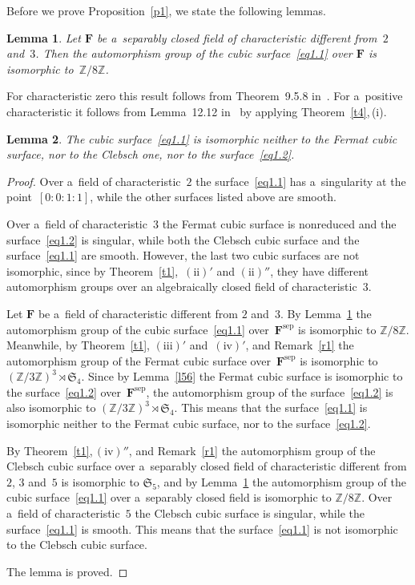 \documentclass{amsart}
\numberwithin{equation}{section}
\theoremstyle{plain}
\newtheorem{lemma}{Lemma}
\theoremstyle{definition}
\theoremstyle{remark}
\begin{document}
Before we prove Proposition~\ref{p1}, we state the following lemmas.

\begin{lemma}
\label{l57}
Let $\mathbf{F}$ be a~separably closed field of characteristic different from~$2$ and~$3$. Then the automorphism group of the cubic surface~\eqref{eq1.1} over $\mathbf{F}$ is isomorphic to~$\mathbb{Z}/8\mathbb{Z}$.
\end{lemma}

For characteristic zero this result follows from Theorem~9.5.8 in~\cite{7}. For a~positive characteristic it follows from Lemma~12.12 in~\cite{8} by applying Theorem~\ref{t4},\,(i).

\begin{lemma}
\label{l58} The
cubic surface~\eqref{eq1.1} is isomorphic neither to the Fermat cubic surface, nor to the Clebsch one, nor to the surface~\eqref{eq1.2}.
\end{lemma}

\begin{proof}
Over a~field of characteristic~$2$ the surface~\eqref{eq1.1} has a~singularity at the point~\mbox{$[0:0:1:1]$,} while the other surfaces listed above are smooth.

Over a~field of characteristic~$3$ the Fermat cubic surface is nonreduced and the surface~\eqref{eq1.2} is singular, while both the Clebsch cubic surface and the surface~\eqref{eq1.1} are smooth. However, the last two cubic surfaces are not isomorphic, since by Theorem~\ref{t1},~$(\mathrm{ii})'$ and $(\mathrm{ii})''$, they have different automorphism groups over an algebraically closed field of characteristic~$3$.

Let $\mathbf{F}$ be a~field of characteristic different from $2$ and~$3$. By Lemma~\ref{l57} the automorphism group of the cubic surface~\eqref{eq1.1} over~$\mathbf{F}^{\mathrm{sep}}$ is isomorphic to $\mathbb{Z}/8\mathbb{Z}$. Meanwhile, by Theorem~\ref{t1}, $(\mathrm{iii})'$ and~$(\mathrm{iv})'$, and Remark~\ref{r1} the automorphism group of the Fermat cubic surface over~$\mathbf{F}^{\mathrm{sep}}$ is isomorphic to $(\mathbb{Z}/3\mathbb{Z})^3 \rtimes \mathfrak{S}_4$. Since by Lemma~\ref{l56} the Fermat cubic surface is isomorphic to the surface~\eqref{eq1.2} over~$\mathbf{F}^{\mathrm{sep}}$, the automorphism group of the surface~\eqref{eq1.2} is also isomorphic to $(\mathbb{Z}/3\mathbb{Z})^3 \rtimes \mathfrak{S}_4$. This means that the surface~\eqref{eq1.1} is isomorphic neither to the Fermat cubic surface, nor to the surface~\eqref{eq1.2}.

By Theorem~\ref{t1},\,$(\mathrm{iv})''$, and Remark~\ref{r1} the automorphism group of the Clebsch cubic surface over a~separably closed field of characteristic different from $2$, $3$ and~$5$ is isomorphic to $\mathfrak{S}_5$, and by Lemma~\ref{l57} the automorphism group of the cubic surface~\eqref{eq1.1} over a~separably closed field is isomorphic to $\mathbb{Z}/8\mathbb{Z}$. Over a~field of characteristic~$5$ the Clebsch cubic surface is singular, while the surface~\eqref{eq1.1} is smooth. This means that the surface~\eqref{eq1.1} is not isomorphic to the Clebsch cubic surface.

The lemma is proved.
\end{proof}
\end{document}
